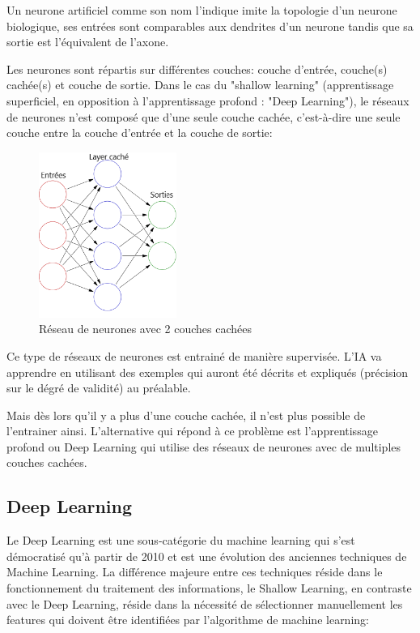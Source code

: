 Un neurone artificiel comme son nom l'indique imite la topologie d'un neurone biologique,
ses entrées sont comparables aux dendrites d'un neurone tandis que sa
sortie est l'équivalent de l'axone. \newline

Les neurones sont répartis sur différentes couches: couche d'entrée, couche(s) cachée(s)
et couche de sortie. Dans le cas du "shallow learning" (apprentissage superficiel,
en opposition à l'apprentissage profond : "Deep Learning"), le réseaux de neurones
n'est composé que d'une seule couche cachée, c'est-à-dire une seule couche entre
la couche d'entrée et la couche de sortie:

\begin{figure}[H]
    \centering
    \includegraphics[width=0.4\textwidth]{Images/shallownnoverview}
    \caption{Réseau de neurones avec 2 couches cachées}
	\label{fig:NN2Layers}
\end{figure}

Ce type de réseaux de neurones est entrainé de manière supervisée.
L'IA va apprendre en utilisant des exemples qui auront été décrits
et expliqués (précision sur le dégré de validité) au préalable.

Mais dès lors qu'il y a plus d'une couche cachée,
il n'est plus possible de l'entrainer ainsi.
L'alternative qui répond à ce problème est l'apprentissage profond ou
Deep Learning qui utilise des réseaux de neurones avec de multiples couches
cachées.


\subsection{Deep Learning}
Le Deep Learning est une sous-catégorie du machine learning qui s'est démocratisé
qu'à partir de 2010 et est une évolution des anciennes techniques de Machine Learning.
La différence majeure entre ces techniques réside dans le fonctionnement du traitement des
informations, le Shallow Learning, en contraste avec le Deep
Learning, réside dans la nécessité de sélectionner manuellement les features
qui doivent être identifiées par l'algorithme de machine learning:

